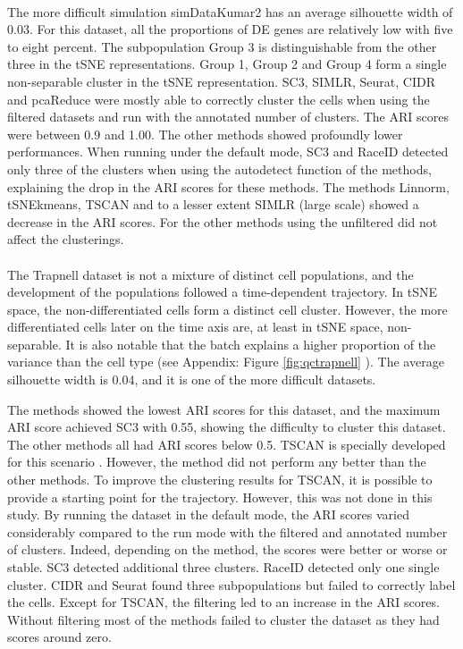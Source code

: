 \documentclass[12pt, a4paper]{article}\usepackage[]{graphicx}\usepackage[]{color}
\begin{document}
\paragraph{}

The more difficult simulation simDataKumar2 has an average silhouette width of 0.03. For this dataset, all the proportions of DE genes are relatively low with five to eight percent. The subpopulation Group 3 is distinguishable from the other three in the tSNE representations. Group 1, Group 2 and Group 4 form a single non-separable cluster in the tSNE representation. SC3, SIMLR, Seurat, CIDR and pcaReduce were mostly able to correctly cluster the cells when using the filtered datasets and run with the annotated number of clusters. The ARI scores were between 0.9 and 1.00. The other methods showed profoundly lower performances. When running under the default mode, SC3 and RaceID detected only three of the clusters when using the autodetect function of the methods, explaining the drop in the ARI scores for these methods. The methods Linnorm, tSNEkmeans, TSCAN and to a lesser extent SIMLR (large scale) showed a decrease in the ARI scores. For the other methods using the unfiltered did not affect the clusterings.
\paragraph{}

The Trapnell dataset is not a mixture of distinct cell populations, and the development of the populations followed a time-dependent trajectory. In tSNE space, the non-differentiated cells form a distinct cell cluster. However, the more differentiated cells later on the time axis are, at least in tSNE space, non-separable. It is also notable that the batch explains a higher proportion of the variance than the cell type (see Appendix: Figure \ref{fig:qctrapnell} ). The average silhouette width is 0.04, and it is one of the more difficult datasets.

The methods showed the lowest ARI scores for this dataset, and the maximum ARI score achieved SC3 with 0.55, showing the difficulty to cluster this dataset. The other methods all had ARI scores below 0.5. TSCAN is specially developed for this scenario \citep{ji2015tscan}. However, the method did not perform any better than the other methods. To improve the clustering results for TSCAN, it is possible to provide a starting point for the trajectory. However, this was not done in this study. By running the dataset in the default mode, the ARI scores varied considerably compared to the run mode with the filtered and annotated number of clusters. Indeed, depending on the method, the scores were better or worse or stable. SC3 detected additional three clusters. RaceID detected only one single cluster. CIDR and Seurat found three subpopulations but failed to correctly label the cells. Except for TSCAN, the filtering led to an increase in the ARI scores. Without filtering most of the methods failed to cluster the dataset as they had scores around zero.
\end{document}
